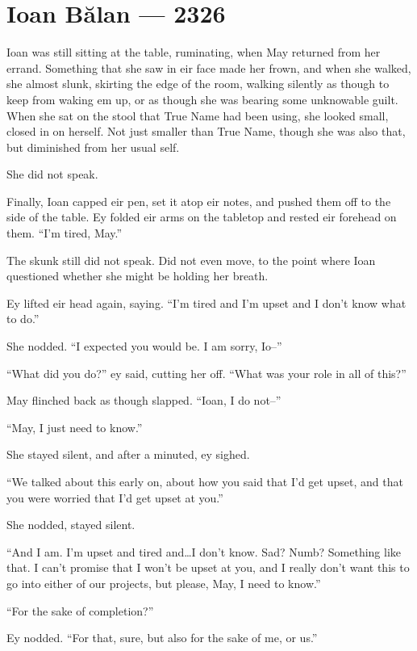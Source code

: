 \hypertarget{ioan-bux103lan-2326}{%
\chapter{Ioan Bălan — 2326}\label{ioan-bux103lan-2326}}

Ioan was still sitting at the table, ruminating, when May returned from her errand. Something that she saw in eir face made her frown, and when she walked, she almost slunk, skirting the edge of the room, walking silently as though to keep from waking em up, or as though she was bearing some unknowable guilt. When she sat on the stool that True Name had been using, she looked small, closed in on herself. Not just smaller than True Name, though she was also that, but diminished from her usual self.

She did not speak.

Finally, Ioan capped eir pen, set it atop eir notes, and pushed them off to the side of the table. Ey folded eir arms on the tabletop and rested eir forehead on them. ``I'm tired, May.''

The skunk still did not speak. Did not even move, to the point where Ioan questioned whether she might be holding her breath.

Ey lifted eir head again, saying. ``I'm tired and I'm upset and I don't know what to do.''

She nodded. ``I expected you would be. I am sorry, Io--''

``What did you do?'' ey said, cutting her off. ``What was your role in all of this?''

May flinched back as though slapped. ``Ioan, I do not--''

``May, I just need to know.''

She stayed silent, and after a minuted, ey sighed.

``We talked about this early on, about how you said that I'd get upset, and that you were worried that I'd get upset at you.''

She nodded, stayed silent.

``And I am. I'm upset and tired and\ldots I don't know. Sad? Numb? Something like that. I can't promise that I won't be upset at you, and I really don't want this to go into either of our projects, but please, May, I need to know.''

``For the sake of completion?''

Ey nodded. ``For that, sure, but also for the sake of me, or us.''

